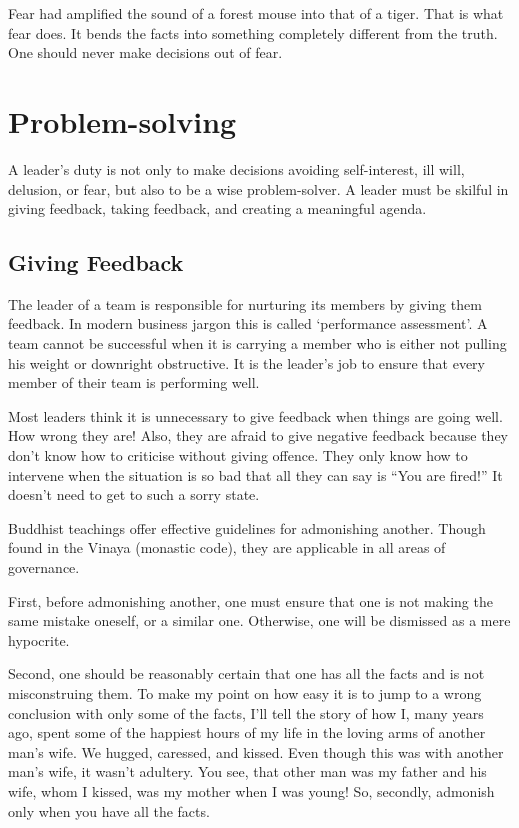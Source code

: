 ﻿\documentclass[11pt, openany]{book}
\begin{document}
Fear had amplified the sound of a forest mouse into that of a tiger. That is what fear does. It bends the facts into something completely different from the truth. One should never make decisions out of fear.

\chapter{Problem-solving}

A leader’s duty is not only to make decisions avoiding self-interest, ill will, delusion, or fear, but also to be a wise problem-solver. A leader must be skilful in giving feedback, taking feedback, and creating a meaningful agenda.


\section{Giving Feedback}

The leader of a team is responsible for nurturing its
members by giving them feedback. In modern business jargon this is called ‘performance assessment’. A team cannot be successful when it is carrying a member who is either not pulling his weight or downright obstructive. It is the leader’s job to ensure that every member of their team is performing well.

Most leaders think it is unnecessary to give feedback when things are going well. How wrong they are! Also, they are afraid to give negative feedback because they don’t know how to criticise without giving offence. They only know how to intervene when the situation is so bad that all they can say is “You are fired!” It doesn’t need to get to such a sorry state.

Buddhist teachings offer effective guidelines for admonishing another. Though found in the Vinaya (monastic code), they are applicable in all areas of governance.

First, before admonishing another, one must ensure that one is not making the same mistake oneself, or a similar one. Otherwise, one will be dismissed as a mere hypocrite.

Second, one should be reasonably certain that one has all the facts and is not misconstruing them. To make my point on how easy it is to jump to a wrong conclusion with only some of the facts, I’ll tell the story of how I, many years ago, spent some of the happiest hours of my life in the loving arms of another man’s wife. We hugged, caressed, and kissed. Even though this was with another man’s wife, it wasn’t adultery. You see, that other man was my father and his wife, whom I kissed, was my mother when I was young! So, secondly, admonish only when you have all the facts.
\end{document}

